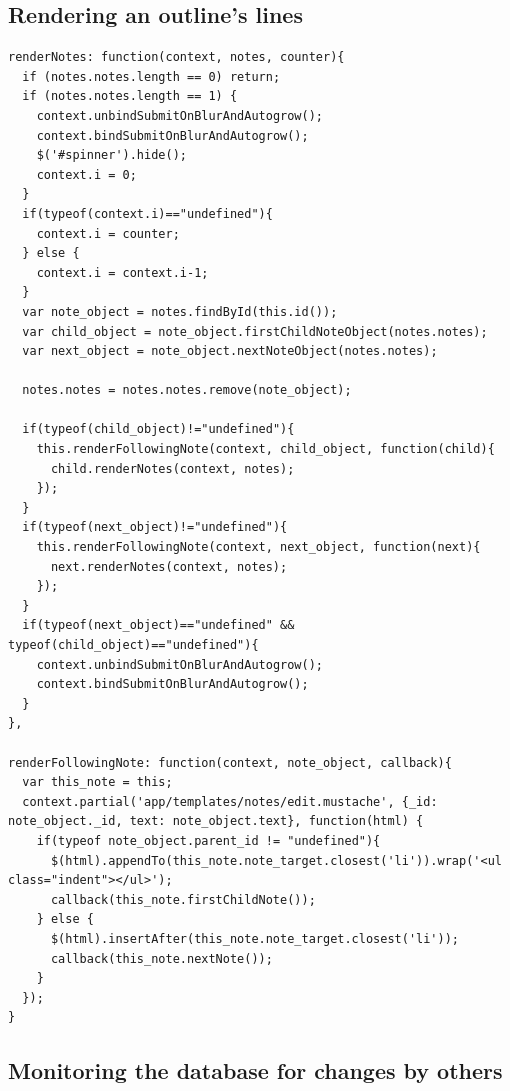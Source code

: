 \subsection{Rendering an outline's lines}

\lstset{language=javascript}
\medskip 
\begin{lstlisting}[label=code:rendernotes, caption=Extract from {\fontfamily{pcr}\selectfont /\_attachments/app/helpers/note\_element.js}]
renderNotes: function(context, notes, counter){
  if (notes.notes.length == 0) return;
  if (notes.notes.length == 1) {
    context.unbindSubmitOnBlurAndAutogrow();
    context.bindSubmitOnBlurAndAutogrow();
    $('#spinner').hide();
    context.i = 0;
  }
  if(typeof(context.i)=="undefined"){
    context.i = counter;
  } else {
    context.i = context.i-1;
  }
  var note_object = notes.findById(this.id());
  var child_object = note_object.firstChildNoteObject(notes.notes);
  var next_object = note_object.nextNoteObject(notes.notes);
  
  notes.notes = notes.notes.remove(note_object);
  
  if(typeof(child_object)!="undefined"){
    this.renderFollowingNote(context, child_object, function(child){
      child.renderNotes(context, notes);
    });
  } 
  if(typeof(next_object)!="undefined"){
    this.renderFollowingNote(context, next_object, function(next){
      next.renderNotes(context, notes);
    });
  }
  if(typeof(next_object)=="undefined" && typeof(child_object)=="undefined"){
    context.unbindSubmitOnBlurAndAutogrow();
    context.bindSubmitOnBlurAndAutogrow();
  }
},

renderFollowingNote: function(context, note_object, callback){
  var this_note = this;
  context.partial('app/templates/notes/edit.mustache', {_id: note_object._id, text: note_object.text}, function(html) {
    if(typeof note_object.parent_id != "undefined"){
      $(html).appendTo(this_note.note_target.closest('li')).wrap('<ul class="indent"></ul>');
      callback(this_note.firstChildNote());
    } else {
      $(html).insertAfter(this_note.note_target.closest('li'));
      callback(this_note.nextNote());        
    }
  });
}
\end{lstlisting}




\subsection{Monitoring the database for changes by others}

